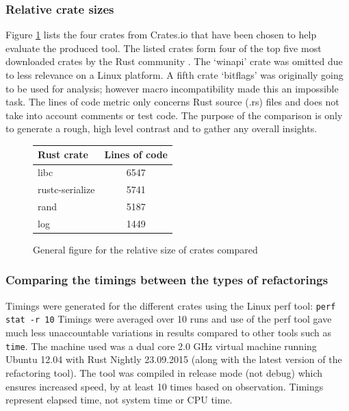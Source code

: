 \subsubsection{Relative crate sizes}
Figure \ref{Fig:codesize} lists the four crates from Crates.io that have been chosen to help evaluate the produced tool. The listed crates form four of the top five most downloaded crates by the Rust community \cite{cratesio15}. The `winapi' crate was omitted due to less relevance on a Linux platform. A fifth crate `bitflags' was originally going to be used for analysis; however macro incompatibility made this an impossible task. The lines of code metric only concerns Rust source (.rs) files and does not take into account comments or test code. The purpose of the comparison is only to generate a rough, high level contrast and to gather any overall insights. 

\begin{figure}[H]
\begin{center}
    \begin{tabular}{ | l | c |}
    \hline
    \textbf{Rust crate} & \textbf{Lines of code} \\ \hline
    libc & 6547 \\ \hline
    rustc-serialize &  5741 \\ \hline
    rand &   5187 \\ \hline
    log &  1449 \\ \hline
    \end{tabular}
\end{center}

\caption{General figure for the relative size of crates compared}
\label{Fig:codesize}
\end{figure}


\subsubsection{Comparing the timings between the types of refactorings}
Timings were generated for the different crates using the Linux perf tool: {\verb|perf stat -r 10|} Timings were averaged over 10 runs and use of the perf tool gave much less unaccountable variations in results compared to other tools such as {\verb|time|}. The machine used was a dual core 2.0 GHz virtual machine running Ubuntu 12.04 with Rust Nightly 23.09.2015 (along with the latest version of the refactoring tool). The tool was compiled in release mode (not debug) which ensures increased speed, by at least 10 times based on observation. Timings represent elapsed time, not system time or CPU time.

